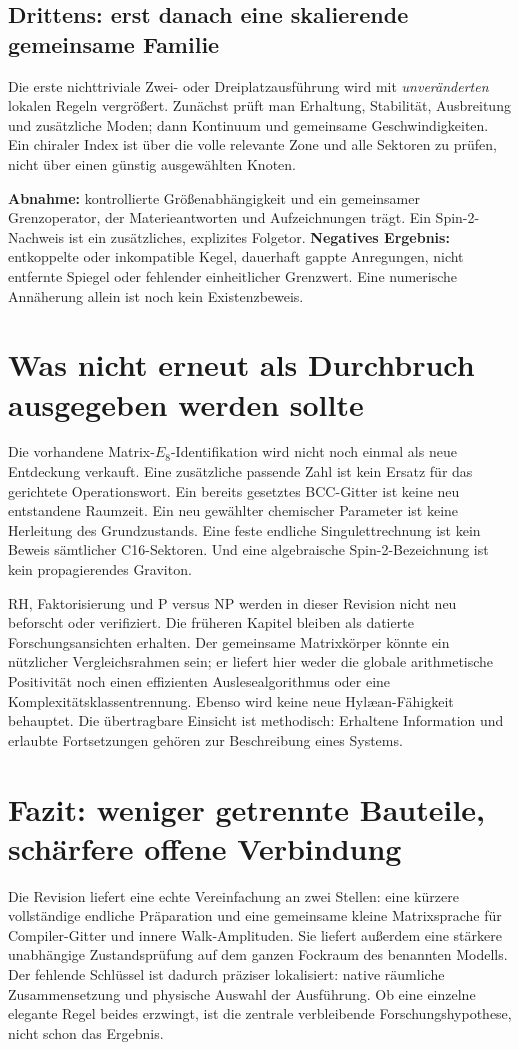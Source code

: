 \subsection{Drittens: erst danach eine skalierende gemeinsame Familie}
Die erste nichttriviale Zwei- oder Dreiplatzausführung wird mit \emph{unveränderten} lokalen Regeln vergrößert. Zunächst prüft man Erhaltung, Stabilität, Ausbreitung und zusätzliche Moden; dann Kontinuum und gemeinsame Geschwindigkeiten. Ein chiraler Index ist über die volle relevante Zone und alle Sektoren zu prüfen, nicht über einen günstig ausgewählten Knoten.

\textbf{Abnahme:} kontrollierte Größenabhängigkeit und ein gemeinsamer Grenzoperator, der Materieantworten und Aufzeichnungen trägt. Ein Spin-2-Nachweis ist ein zusätzliches, explizites Folgetor. \textbf{Negatives Ergebnis:} entkoppelte oder inkompatible Kegel, dauerhaft gappte Anregungen, nicht entfernte Spiegel oder fehlender einheitlicher Grenzwert. Eine numerische Annäherung allein ist noch kein Existenzbeweis.

\section{Was nicht erneut als Durchbruch ausgegeben werden sollte}
Die vorhandene Matrix-$E_8$-Identifikation wird nicht noch einmal als neue Entdeckung verkauft. Eine zusätzliche passende Zahl ist kein Ersatz für das gerichtete Operationswort. Ein bereits gesetztes BCC-Gitter ist keine neu entstandene Raumzeit. Ein neu gewählter chemischer Parameter ist keine Herleitung des Grundzustands. Eine feste endliche Singulettrechnung ist kein Beweis sämtlicher C16-Sektoren. Und eine algebraische Spin-2-Bezeichnung ist kein propagierendes Graviton.

RH, Faktorisierung und P versus NP werden in dieser Revision nicht neu beforscht oder verifiziert. Die früheren Kapitel bleiben als datierte Forschungsansichten erhalten. Der gemeinsame Matrixkörper könnte ein nützlicher Vergleichsrahmen sein; er liefert hier weder die globale arithmetische Positivität noch einen effizienten Auslesealgorithmus oder eine Komplexitätsklassentrennung. Ebenso wird keine neue Hylæan-Fähigkeit behauptet. Die übertragbare Einsicht ist methodisch: Erhaltene Information und erlaubte Fortsetzungen gehören zur Beschreibung eines Systems.

\section{Fazit: weniger getrennte Bauteile, schärfere offene Verbindung}
Die Revision liefert eine echte Vereinfachung an zwei Stellen: eine kürzere vollständige endliche Präparation und eine gemeinsame kleine Matrixsprache für Compiler-Gitter und innere Walk-Amplituden. Sie liefert außerdem eine stärkere unabhängige Zustandsprüfung auf dem ganzen Fockraum des benannten Modells. Der fehlende Schlüssel ist dadurch präziser lokalisiert: native räumliche Zusammensetzung und physische Auswahl der Ausführung. Ob eine einzelne elegante Regel beides erzwingt, ist die zentrale verbleibende Forschungshypothese, nicht schon das Ergebnis.
